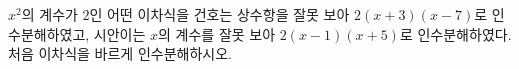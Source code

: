 $x^2$의 계수가 $2$인 어떤 이차식을 건호는 상수항을 잘못 보아 $2(x+3)(x-7)$로 인수분해하였고, 시안이는 $x$의 계수를 잘못 보아 $2(x-1)(x+5)$로 인수분해하였다. 처음 이차식을 바르게 인수분해하시오.
